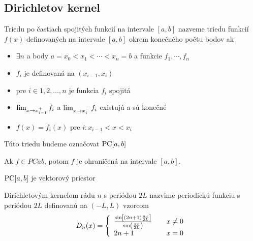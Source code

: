 
\subsection{Dirichletov kernel}
\begin{definicia}
    Triedu po častiach spojitých funkcií na intervale $[a,b]$ nazveme
    triedu funkcií $f(x)$ definovaných na intervale $[a,b]$ okrem
    konečného počtu bodov ak
    \begin{itemize}
        \item
            $\exists n$ a body $a=x_0<x_1<\cdots<x_n=b$ a funkcie
            $f_1, \cdots, f_n$
        \item
            $f_i$ je definovaná na $(x_{i-1},x_i)$
        \item
            pre $i \in 1,2,\dots,n$ je funkcia $f_i$ spojitá
        \item
            $\lim_{x \rightarrow x_{i-1}^+} f_i$ a 
            $\lim_{x \rightarrow x_i^-} f_i$ existujú a sú konečné
        \item
            $f(x) = f_i(x)$ pre $i: x_{i-1} < x < x_i$
    \end{itemize}
    Túto triedu budeme označovat $\mbox{PC}[a,b]$
\end{definicia}

\begin{lema}
    Ak $f \in PCab$, potom $f$ je ohraničená na intervale $[a,b]$.
    \label{lema:ohranicenost_na_pcab}
\end{lema}

\begin{lema}
    $\mbox{PC}[a,b]$ je vektorový priestor
\end{lema}
\begin{dokaz}
\end{dokaz}

\begin{definicia}
Dirichletovým kernelom  rádu $n$ s periódou $2L$ nazvime periodickú funkciu
s periódou $2L$ definovanú na $(-L,L)$ vzorcom
\begin{equation}
    D_n(x) = \left\{
        \begin{array}{l l}
            \frac{\sin\left[(2n+1) \frac{\pi x}{2 L}\right]}{
            \sin\left(\frac{\pi x}{2 L}\right)} \quad& x\not=0 \\
            2n+1 \quad& x=0
        \end{array}
    \right.
\end{equation}
\end{definicia}

